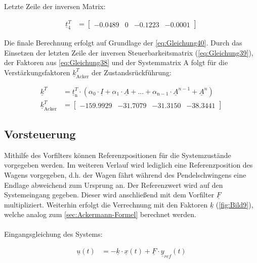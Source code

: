 Letzte Zeile der inversen Matrix:

\begin{align} \label{eq:Gleichung39}
    \underline{t}_{\mathrm{4}}^T &=
    \begin{bmatrix}
        -0.0489 & 0 & -0.1223 & -0.0001
    \end{bmatrix}
\end{align}

Die finale Berechnung erfolgt auf Grundlage der \autoref{eq:Gleichung40}. Durch das Einsetzen der letzten Zeile der inversen Steuerbarkeitsmatrix (\autoref{eq:Gleichung39}), der Faktoren aus \autoref{eq:Gleichung38} und der Systemmatrix A folgt für die Verstärkungsfaktoren $\underline{k}^T_{\mathrm{Acker}}$ der Zustandsrückführung:

\begin{align}
    \underline{k}^T &= \underline{t}_{\mathrm{n}}^T\cdot(\alpha_{\mathrm{0}}\cdot\underline{I} + \alpha_{\mathrm{1}}\cdot \underline{A} + ... + \alpha_{\mathrm{n-1}}\cdot \underline{A}^{n-1}+\underline{A}^n) \label{eq:Gleichung40}\\
    \underline{k}^T_{\mathrm{Acker}} &=
    \begin{bmatrix}
        -159.9929 & -31.7079 & -31.3150 & -38.3441
    \end{bmatrix} \label{eq:Gleichung41}
\end{align}

\subsection{Vorsteuerung}

Mithilfe des Vorfilters können Referenzpositionen für die Systemzustände vorgegeben werden. Im weiteren Verlauf wird lediglich eine Referenzposition des Wagens vorgegeben, d.h. der Wagen fährt während des Pendelschwingens eine Endlage abweichend zum Ursprung an. Der Referenzwert wird auf den Systemeingang gegeben. Dieser wird anschließend mit dem Vorfilter $\underline{F}$ multipliziert. Weiterhin erfolgt die Verrechnung mit den Faktoren $\underline{k}$ (\autoref{fig:Bild9}), welche analog zum \autoref{sec:Ackermann-Formel} berechnet werden.\\\\
Eingangsgleichung des Systems:

\begin{align}\label{eq:Gleichung42}
    \underline{u}(t) &= -\underline{k}\cdot\underline{x}(t)+\underline{F}\cdot\underline{y}_{ref}(t)
\end{align}

